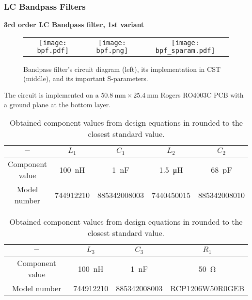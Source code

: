 \begin{frame}
	\frametitle{LC Bandpass Filters}
	\textbf{3rd order LC Bandpass filter, 1st variant}\\
	\vspace{-50pt}
	\begin{figure}
		\centering
		\begin{tabular}{ccc}
			\texttt{[image: bpf.pdf]}&
			\texttt{[image: bpf.png]}&
			\texttt{[image: bpf\_sparam.pdf]}
		\end{tabular}
		\caption{Bandpass filter's circuit diagram (left), its implementation in CST (middle), and its important S-parameters.}
	\end{figure}
	\vspace{-20pt}
	The circuit is implemented on a $\SI{50.8}{\milli\meter} \times \SI{25.4}{\milli\meter}$ Rogers RO4003C PCB with a ground plane at the bottom layer.
	\vspace{-20pt}
	\begin{table}[ptbh]
		\centering
		\begin{tabular}{|c c c c c|}
			\hline
			$-$ & $L_1$ & $C_1$ & $L_2$ & $C_2$ \\
			\hline
			Component value & \SI{100}{\nano\henry} & \SI{1}{\nano\farad} & \SI{1.5}{\micro\henry} & \SI{68}{\pico\farad}\\
			Model number & 744912210 & 885342008003 & 7440450015 & 885342008010\\
			\hline
		\end{tabular} 
		\begin{tabular}{|c c c c|}
			\hline
			$-$ & $L_3$ & $C_3$ & $R_1$\\
			\hline
			Component value & \SI{100}{\nano\henry} & \SI{1}{\nano\farad} & \SI{50}{\ohm}\\
			Model number & 744912210 & 885342008003 & RCP1206W50R0GEB\\
			\hline
		\end{tabular}
		\caption{Obtained component values from design equations in \cite{lam} rounded to the closest standard value.}
	\end{table}
\end{frame}

